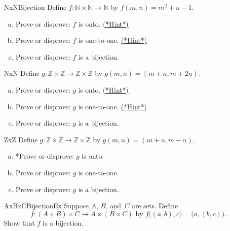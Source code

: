  
 \begin{exercise}{NxNBijection} 
 Define $f \colon \mathbb{N} \times \mathbb{N} \to \mathbb{N}$ by $f(m,n) = m^2 + n - 1$. 
 \begin{enumerate}[(a)]
 \item \label{NxNBijection-m2+n-onto}  
 Prove or disprove: $f$ is onto.
 \hyperref[sec:functions:hints]{(*Hint*)}
 \item \label{NxNBijection-m2+n-not11}  
Prove or disprove: $f$ is one-to-one.
 \hyperref[sec:functions:hints]{(*Hint*)}
\item
Prove or disprove:  $f$ is a bijection.
 \end{enumerate}
\end{exercise}

\begin{exercise}{NxN}
Define $g \colon \mathbb{Z} \times \mathbb{Z} \to \mathbb{Z} \times \mathbb{Z}$ by $g(m,n) = (m + n, m + 2n)$. 
 \begin{enumerate}[(a)]
 \item  \label{NxNBijection-mpmn-notonto1}  
Prove or disprove: $g$ is onto.
\hyperref[sec:functions:hints]{(*Hint*)} 
 \item  \label{NxNBijection-mpmn-111}  
Prove or disprove: $g$ is one-to-one.
\hyperref[sec:functions:hints]{(*Hint*)}
\item
Prove or disprove: $g$ is a bijection.
 \end{enumerate}
\end{exercise}

\begin{exercise}{ZxZ}
Define $g \colon \mathbb{Z} \times \mathbb{Z} \to \mathbb{Z} \times \mathbb{Z}$ by $g(m,n) = (m + n, m - n)$. 
 \begin{enumerate}[(a)]
 \item  \label{NxNBijection-mpmn-notonto}  
*Prove or disprove: $g$ is  onto.
 \item  \label{NxNBijection-mpmn-11}  
Prove or disprove: $g$ is one-to-one.
\item
Prove or disprove: $g$ is a bijection.
 \end{enumerate}
\end{exercise}


\begin{exercise}{AxBxCBijectionEx} \label{AxBxCBijectionEx}
Suppose $A$, $B$, and~$C$ are sets. Define 
\[
 f \colon (A \times B) \times C \to A \times (B \times C)  \text{ by } 
f\bigl( (a,b),c \bigr) = \bigl( a,(b, c) \bigr).\]
Show that $f$ is a bijection.
\end{exercise}

